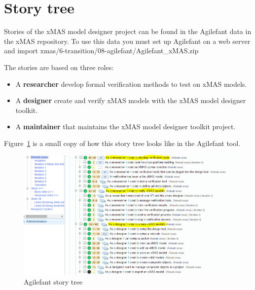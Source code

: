\section{Story tree}

Stories of the xMAS model designer project can be found in the Agilefant data in the xMAS repository.
To use this data you must set up Agilefant on a web server and import xmas/6-transition/08-agilefant/Agilefant_xMAS.zip

The stories are based on three roles:
\begin{itemize}
\item A \textbf{researcher} develop formal verification methods to test on xMAS models.
\item A \textbf{designer} create and verify xMAS models with the xMAS model designer toolkit. 
\item A \textbf{maintainer} that maintains the xMAS model designer toolkit project. 
\end{itemize}

Figure~\ref{fig:story-tree} is a small copy of how this story tree looks like in the Agilefant tool.


\begin{figure}[here]
\begin{center}	
	\includegraphics[width=.70\linewidth]{pictures/story-tree}
	\caption{Agilefant story tree}
	\label{fig:story-tree}
\end{center}
\end{figure}

